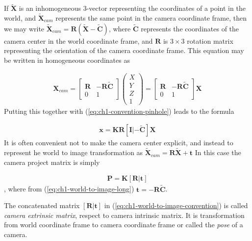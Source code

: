If $\widetilde{\mathbf{X}}$ is an inhomogeneous 3-vector representing the coordinates of a point in the world, and $\widetilde{\mathbf{X}}_{cam}$ represents the same point in the camera coordinate frame, then we may write $\widetilde{\mathbf{X}}_{cam} = \mathbf{R}(\widetilde{\mathbf{X}} - \widetilde{\mathbf{C}})$, where $\widetilde{\mathbf{C}}$ represents the coordinates of the camera center in the world coordinate frame, and $\mathbf{R}$ is $3 \times 3$ rotation matrix representing the orientation of the camera coordinate frame. This equation may be written in homogeneous coordinates as

\begin{gather}
\mathbf{X}_{cam}
=
\begin{bmatrix}
\mathbf{R} &  -\mathbf{R}\widetilde{\mathbf{C}} \\
0 & 1
\end{bmatrix}
\begin{pmatrix} X  \\ Y \\ Z \\ 1 \end{pmatrix}
=
\begin{bmatrix}
\mathbf{R} &  -\mathbf{R}\widetilde{\mathbf{C}} \\
0 & 1
\end{bmatrix}
\mathbf{X}
\end{gather}
Putting this together with (\ref{eq:ch1-convention-pinhole}) leads to the formula

\begin{gather}
\mathbf{x = K R [ I  |  -\widetilde{C}]X}
\label{eq:ch1-world-to-image-long}
\end{gather}
It is often convenient not to make the camera center explicit, and instead to represent he world to image transformation as $\widetilde{\mathbf{X}}_{cam} = \mathbf{R}\widetilde{\mathbf{X}} + \mathbf{t}$
In this case the camera project matrix is simply 

\begin{gather}
\mathbf{P} = \mathbf{K} [\mathbf{R} | \mathbf{t}]
\label{eq:ch1-world-to-image-convention}
\end{gather}
, where from (\ref{eq:ch1-world-to-image-long}) $\mathbf{t} = -\mathbf{R}\widetilde{\mathbf{C}}$.

The concatenated matrix $[\mathbf{R} | \mathbf{t}]$ in (\ref{eq:ch1-world-to-image-convention}) is called \textit{camera extrinsic matrix}, respect to camera intrinsic matrix. It is transformation from world coordinate frame to camera coordinate frame or called the \textit{pose} of a camera.

